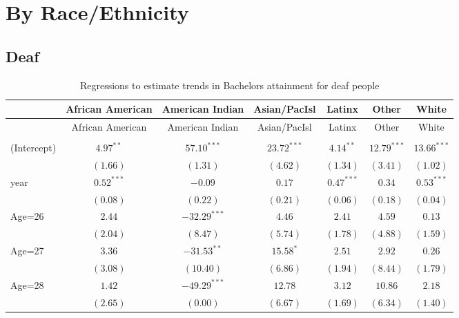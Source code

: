 \documentclass[fullpage]{paper}
\begin{document}
\section{ By Race/Ethnicity }

\subsection{ Deaf }

\begin{center}
\begin{longtable}{l c c c c c c }
\hline
 & African American & American Indian & Asian/PacIsl & Latinx & Other & White \\
\hline
\endfirsthead
\hline
 & African American & American Indian & Asian/PacIsl & Latinx & Other & White \\
\hline
\endhead
\hline
\endfoot
\hline
\multicolumn{7}{l}{\scriptsize{$^{***}p<0.001$, $^{**}p<0.01$, $^*p<0.05$}}\\
\caption{Regressions to estimate trends in Bachelors attainment for deaf people}
\label{table:coefficients}
\endlastfoot
(Intercept) & $4.97^{**}$  & $57.10^{***}$  & $23.72^{***}$ & $4.14^{**}$  & $12.79^{***}$ & $13.66^{***}$ \\
            & $(1.66)$     & $(1.31)$       & $(4.62)$      & $(1.34)$     & $(3.41)$      & $(1.02)$      \\
year        & $0.52^{***}$ & $-0.09$        & $0.17$        & $0.47^{***}$ & $0.34$        & $0.53^{***}$  \\
            & $(0.08)$     & $(0.22)$       & $(0.21)$      & $(0.06)$     & $(0.18)$      & $(0.04)$      \\
Age=26      & $2.44$       & $-32.29^{***}$ & $4.46$        & $2.41$       & $4.59$        & $0.13$        \\
            & $(2.04)$     & $(8.47)$       & $(5.74)$      & $(1.78)$     & $(4.88)$      & $(1.59)$      \\
Age=27      & $3.36$       & $-31.53^{**}$  & $15.58^{*}$   & $2.51$       & $2.92$        & $0.26$        \\
            & $(3.08)$     & $(10.40)$      & $(6.86)$      & $(1.94)$     & $(8.44)$      & $(1.79)$      \\
Age=28      & $1.42$       & $-49.29^{***}$ & $12.78$       & $3.12$       & $10.86$       & $2.18$        \\
            & $(2.65)$     & $(0.00)$       & $(6.67)$      & $(1.69)$     & $(6.34)$      & $(1.40)$      \\

\end{longtable}
\end{center}
\end{document}
